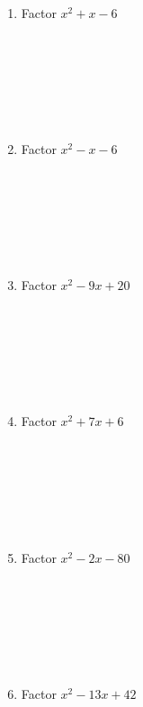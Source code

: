 \documentclass{article}
\begin{document}
\begin{minipage}[t]{0.45\textwidth}
    \begin{enumerate}
        \item Factor $x^2 + x - 6$
        \\\\\\\\\\\\\\
        \item Factor $x^2 - x - 6$
        \\\\\\\\\\\\\\
        \item Factor $x^2 - 9x + 20$
        \\\\\\\\\\\\\\
        \item Factor $x^2 + 7x + 6$
        \\\\\\\\\\\\\\
        \item Factor $x^2 - 2x - 80$
        \\\\\\\\\\\\\\
        \item Factor $x^2 - 13x + 42$
        
        
    \end{enumerate}
\end{minipage}%
\hfill
\end{document}
